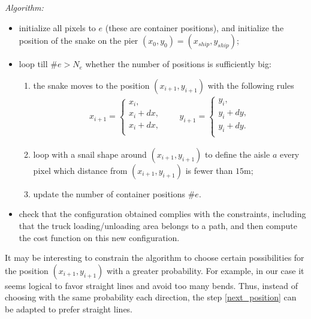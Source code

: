 \documentclass{article}
\begin{document}
\noindent
\textit{Algorithm:}
\begin{itemize}
	\item initialize all pixels to $ e $ (these are container positions), and initialize the position of the snake on the pier $ (x_0, y_0) = (x_ {ship}, y_ {ship}) $;

    \item  loop till $\#e>N_e$ whether the number of positions is sufficiently big:
    \begin{enumerate}
        \item\label{next_position} the snake moves to the position $(x_{i+1},y_{i+1})$ with the following rules
			\begin{eqnarray}
			x_{i+1} = \left\{\begin{array}{l}
			x_i, \\
			x_i + dx,\\
			x_i + dx, \\
			\end{array}\right. \qquad
			y_{i+1}	 = \left\{\begin{array}{l}
			y_i, \\
			y_i + dy,\\
			y_i + dy. \\
			\end{array}\right.
			\nonumber
			\end{eqnarray}
			 \item  loop with a snail shape around $(x_{i+1},y_{i+1})$ to define the aisle $a$ every pixel which distance from $(x_{i+1},y_{i+1})$ is fewer than $15$m; %
			\item  update the number of container positions $\#e$.
	\end{enumerate}
	\item check that the configuration obtained complies with the constraints, including that the truck loading/unloading area belongs to a path, and then compute the cost function on this new configuration.
\end{itemize}

It may be interesting to constrain the algorithm to choose certain possibilities for the position $ (x_ {i + 1}, y_ {i + 1}) $ with a greater probability. 
For example, in our case it seems logical to favor straight lines and avoid too many bends. 
Thus, instead of choosing with the same probability each direction, the step \ref{next_position} can be adapted to prefer straight lines.
\end{document}
